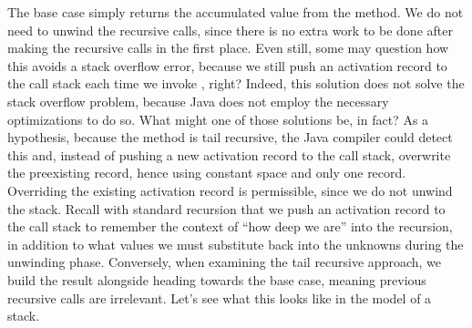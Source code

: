 The base case simply returns the accumulated value from the method. 
We do not need to unwind the recursive calls, since there is no extra work to be done after making the recursive calls in the first place. 
Even still, some may question how this avoids a stack overflow error, because we still push an activation record to the call stack each time we invoke , right? 
Indeed, this solution does not solve the stack overflow problem, because Java does not employ the necessary optimizations to do so.
What might one of those solutions be, in fact? As a hypothesis, because the method is tail recursive, the Java compiler could detect this and, instead of pushing a new activation record to the call stack, overwrite the preexisting record, hence using constant space and only one record. 
Overriding the existing activation record is permissible, since we do not unwind the stack.
Recall with standard recursion that we push an activation record to the call stack to remember the context of ``how deep we are'' into the recursion, in addition to what values we must substitute back into the unknowns during the unwinding phase. 
Conversely, when examining the tail recursive approach, we build the result alongside heading towards the base case, meaning previous recursive calls are irrelevant. 
Let's see what this looks like in the model of a stack.

